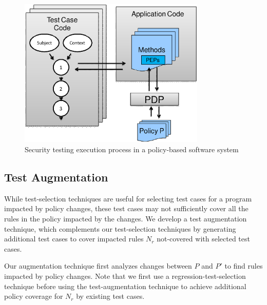 \begin{figure}[t]
  \centering
     \includegraphics[width=3.5in]{testaugument.eps}
    \vspace{-4pt}
 \caption{\label{fig:testexecution}Security testing execution process in a policy-based software system}
  \vspace{-10pt}
 \vspace{+3pt}
\end{figure}

\subsection{Test Augmentation}
\label{subsec:testaugmentation}
While test-selection techniques are useful for selecting test cases for a program impacted by policy changes, these test cases may not sufficiently cover all the rules in the policy impacted by the changes.
We develop a test augmentation technique, which complements our test-selection techniques by generating additional test cases to 
cover impacted rules $N_r$ not-covered with selected test cases.


Our augmentation technique first analyzes changes between $P$ and $P'$ to find rules impacted by policy changes.
Note that we first use a regression-test-selection technique before using the test-augmentation technique to achieve
additional policy coverage for $N_r$ by existing test cases.

